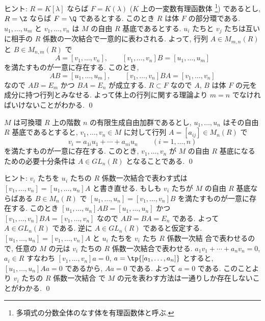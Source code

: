 \documentclass[12pt,twoside]{jarticle}
\begin{document}
\noindent
ヒント: $R=K[\lambda]$ ならば $F=K(\lambda)$ ($K$ 上の一変数有理函数体%
\footnote{多項式の分数全体のなす体を有理函数体と呼ぶ.}) であるとし, 
$R=\Z$ ならば $F=\Q$ であるとする. このとき $R$ は体 $F$ の部分環である.
$u_1,\dots,u_m$ と $v_1,\dots,v_n$ は $M$ の自由 $R$ 基底であるとする. 
$u_i$ たちと $v_j$ たちは互いに相手の $R$ 係数の一次結合で一意的に表わされる.
よって, 行列 $A\in M_{m,n}(R)$ と $B\in M_{n,m}(R)$ で
\begin{equation*}
  [u_1,\dots,u_m]A=[v_1,\dots,v_n],
  \qquad
  [v_1,\dots,v_n]B=[u_1,\dots,u_m]
\end{equation*}
を満たすものが一意に存在する. このとき,
\begin{equation*}
  [u_1,\dots,u_m]AB=[u_1,\dots,u_m], 
  \qquad
  [v_1,\dots,v_n]BA=[v_1,\dots,v_n]
\end{equation*}
なので $AB=E_m$ かつ $BA=E_n$ が成立する. 
$R\subset F$ なので $A$, $B$ は体 $F$ の元を成分に持つ行列とみなせる.
よって体上の行列に関する理論より $m=n$ でなければいけないことがわかる.
\qed


\begin{question}[自由基底の取り換え]
\label{q:free-bases}
  $M$ は可換環 $R$ 上の階数 $n$ の有限生成自由加群であるとし,
  $u_1,\dots,u_n$ はその自由 $R$ 基底であるとすると,
  $v_1,\dots,v_n\in M$ に対して行列 $A=[a_{ij}]\in M_n(R)$ で
  \begin{equation*}
    v_i = a_{1i}u_1 + \cdots + a_{ni}u_n
    \qquad (i=1,\dots,n)
  \end{equation*}
  を満たすものが一意に存在する. このとき, $v_1,\dots,v_n$ が $M$ の自由 $R$ 
  基底になるための必要十分条件は $A\in GL_n(R)$ となることである.
  \qed
\end{question}

\noindent
ヒント: $v_i$ たちを $u_i$ たちの $R$ 係数一次結合で表わす式は %
$[v_1,\dots,v_n]=[u_1,\dots,u_n]A$ と書き直せる.
もしも $v_i$ たちが $M$ の自由 $R$ 基底ならばある $B\in M_n(R)$ 
で $[u_1,\dots,u_n]=[v_1,\dots,v_n]B$ を満たすものが一意に存在する.
このとき $[u_1,\dots,u_n]AB=[u_1,\dots,u_n]$ 
かつ $[v_1,\dots,v_n]BA=[v_1,\dots,v_n]$ なので $AB=BA=E_n$ である.
よって $A\in GL_n(R)$ である.
逆に $A\in GL_n(R)$ であると仮定する.
$[u_1,\dots,u_n]=[v_1,\dots,v_n]A$ と $u_i$ たちを $v_i$ たち $R$ 係数一次結
合で表わせるので, 任意の $M$ の元は $v_i$ たちの $R$ 係数一次結合で表わせる.
$a_1v_1+\cdots+a_nv_n=0$, $a_i\in R$ すなわち $[v_1,\dots,v_n]a=0$, 
$a=\tp{[a_1,\dots,a_n]}$ とすると, $[u_1,\dots,u_n]Aa=0$ であるから, 
$Aa=0$ である. よって $a=0$ である. このことより $v_i$ たちの $R$ 係数一次結合
で $M$ の元を表わす方法は一通りしか存在しないことがわかる.
\qed
\end{document}
